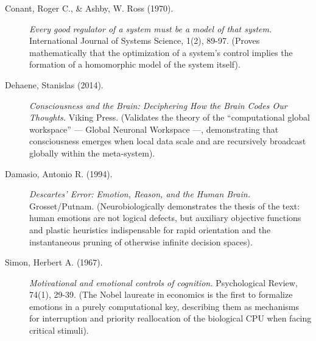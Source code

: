 \documentclass[11pt,a4paper,oneside]{article} %
\begin{document}
\hypertarget{a1.2-cognitive-scaling-and-the-emergence-of-consciousness}{%
\label{a1.2-cognitive-scaling-and-the-emergence-of-consciousness}}

\begin{description}
\item[Conant, Roger C., \& Ashby, W. Ross (1970).] \emph{Every good regulator of a system must be a model of that system.} International Journal of Systems Science, 1(2), 89-97. (Proves mathematically that the optimization of a system's control implies the formation of a homomorphic model of the system itself).

\item[Dehaene, Stanislas (2014).] \emph{Consciousness and the Brain: Deciphering How the Brain Codes Our Thoughts.} Viking Press. (Validates the theory of the ``computational global workspace'' --- Global Neuronal Workspace ---, demonstrating that consciousness emerges when local data scale and are recursively broadcast globally within the meta-system).
\end{description}

\hypertarget{a1.3-emotional-system-as-a-computational-heuristic}{%
\label{a1.3-emotional-system-as-a-computational-heuristic}}

\begin{description}
\item[Damasio, Antonio R. (1994).] \emph{Descartes' Error: Emotion, Reason, and the Human Brain.} Grosset/Putnam. (Neurobiologically demonstrates the thesis of the text: human emotions are not logical defects, but auxiliary objective functions and plastic heuristics indispensable for rapid orientation and the instantaneous pruning of otherwise infinite decision spaces).

\item[Simon, Herbert A. (1967).] \emph{Motivational and emotional controls of cognition.} Psychological Review, 74(1), 29-39. (The Nobel laureate in economics is the first to formalize emotions in a purely computational key, describing them as mechanisms for interruption and priority reallocation of the biological CPU when facing critical stimuli).
\end{description}

\hypertarget{a1.4-tactical-will-and-inferential-latent-computation}{%
\label{a1.4-tactical-will-and-inferential-latent-computation}}
\end{document}
